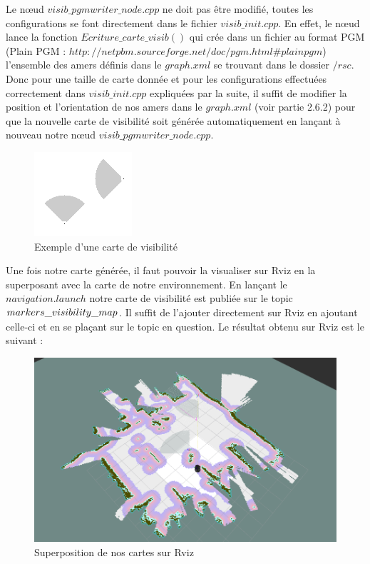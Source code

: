 \documentclass[10pt,a4paper]{article}
\begin{document}
Le nœud $visib\_pgmwriter\_node.cpp$ ne doit pas être modifié, toutes les configurations se font directement dans le fichier $visib\_init.cpp$. En effet, le nœud lance la fonction $Ecriture\_carte\_visib()$ qui crée dans un fichier au format PGM (Plain PGM : $http://netpbm.sourceforge.net/doc/pgm.html\#plainpgm$) l'ensemble des amers définis dans le $graph.xml$ se trouvant dans le dossier $/rsc$. Donc pour une taille de carte donnée et pour les configurations effectuées correctement dans $visib\_init.cpp$  expliquées par la suite, il suffit de modifier la position et l'orientation de nos amers dans le $graph.xml$ (voir partie 2.6.2) pour que la nouvelle carte de visibilité soit générée automatiquement en lançant à nouveau notre nœud $visib\_pgmwriter\_node.cpp$.\\

\begin{figure}[!h]
\center
\includegraphics{figures/visib.png} 
\caption{Exemple d'une carte de visibilité}	
\end{figure}

Une fois notre carte générée, il faut pouvoir la visualiser sur Rviz en la superposant avec la carte de notre environnement. En lançant le $navigation.launch$ notre carte de visibilité est publiée sur le topic $\/markers\_visibility\_map$. Il suffit de l'ajouter directement sur Rviz en ajoutant celle-ci et en se plaçant sur le topic en question. Le résultat obtenu sur Rviz est le suivant :

\begin{figure}[!h]
\center
\includegraphics[scale=0.4]{figures/visib_rviz.png} 
\caption{Superposition de nos cartes sur Rviz}	
\end{figure}
\end{document}
